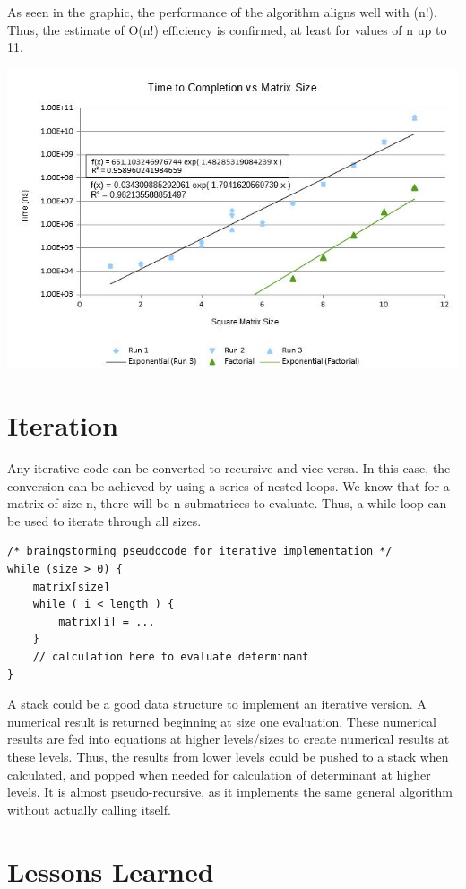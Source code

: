 \documentclass[12pt, titlepage]{article}
\begin{document}
As seen in the graphic, the performance of the algorithm aligns well with (n!). Thus, the estimate of O(n!) efficiency is confirmed, at least for values of n up to 11. 

\includegraphics[width=\textwidth]{efficiency}

\section{Iteration}

Any iterative code can be converted to recursive and vice-versa. In this case, the conversion can be achieved by using a series of nested loops. We know that for a matrix of size n, there will be n submatrices to evaluate. Thus, a while loop can be used to iterate through all sizes.
\begin{lstlisting}
/* braingstorming pseudocode for iterative implementation */
while (size > 0) {
	matrix[size]
	while ( i < length ) {
		matrix[i] = ...
	}
	// calculation here to evaluate determinant
}
\end{lstlisting}
A stack could be a good data structure to implement an iterative version. A numerical result is returned beginning at size one evaluation. These numerical results are fed into equations at higher levels/sizes to create numerical results at these levels. Thus, the results from lower levels could be pushed to a stack when calculated, and popped when needed for calculation of determinant at higher levels. It is almost pseudo-recursive, as it implements the same general algorithm without actually calling itself.

\section{Lessons Learned}
\end{document}
